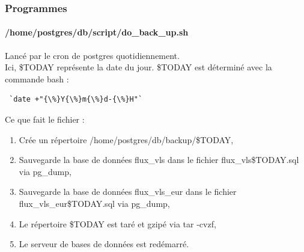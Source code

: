 \subsubsection{Programmes}
\paragraph{/home/postgres/db/script/do{\_}back{\_}up.sh} Lancé par le cron de postgres quotidiennement.\\
Ici, {\$}TODAY représente la date du jour. {\$}TODAY est déterminé avec la commande bash :
\lstset{language=bash}
\begin{lstlisting}
 `date +"{\%}Y{\%}m{\%}d-{\%}H"`
\end{lstlisting}
Ce que fait le fichier : 
\begin{enumerate}
\item Crée un répertoire /home/postgres/db/backup/{\$}TODAY,
\item Sauvegarde la base de données flux{\_}vls dans le fichier flux{\_}vls{\$}TODAY.sql via pg{\_}dump,
\item Sauvegarde la base de données flux{\_}vls{\_}eur dans le fichier flux{\_}vls{\_}eur{\$}TODAY.sql via pg{\_}dump,
\item Le répertoire {\$}TODAY est {\og}taré{\fg}  et {\og}gzipé{\fg}  via tar -cvzf,
\item Le serveur de bases de données est redémarré.
\end{enumerate}
